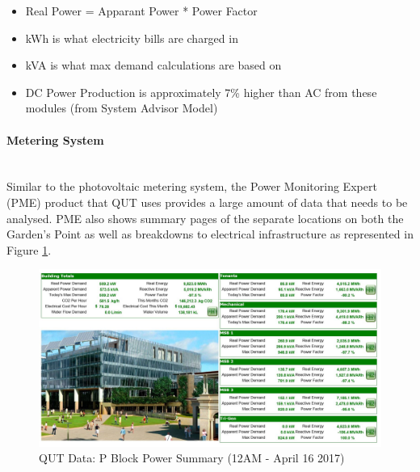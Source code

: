 \begin{itemize}[noitemsep,nolistsep]
	\item Real Power = Apparant Power * Power Factor
	\item kWh is what electricity bills are charged in
	\item kVA is what max demand calculations are based on
	\item DC Power Production is approximately 7\% higher than AC from these modules (from System Advisor Model)
\end{itemize} 

\newpage

\paragraph{Metering System}
~~\\
Similar to the photovoltaic metering system, the Power Monitoring Expert (PME) product that QUT uses provides a large amount of data that needs to be analysed. PME also shows summary pages of the separate locations on both the Garden's Point as well as breakdowns to electrical infrastructure as represented in Figure \ref{fig:qut-pme-pblock-summary}. 

\begin{figure}[H]
	\hfill\includegraphics[width = 150mm]{images/metering/pme/pme-p-block-summary-page}\hspace*{\fill}
	\caption{QUT Data: P Block Power Summary (12AM - April 16 2017)} 
	\label{fig:qut-pme-pblock-summary}
\end{figure} 

